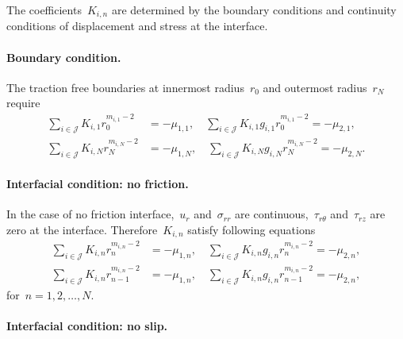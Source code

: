 \documentclass[preprint,10pt,times]{elsarticle}
\numberwithin{equation}{section}
\renewcommand{\>}{$\Rightarrow$}
\begin{document}
The coefficients~$K_{i,n}$ are determined by the boundary conditions and continuity conditions of displacement and stress at the interface.

\paragraph{Boundary condition.}

The traction free boundaries at innermost radius~$r_0$ and outermost radius~$r_N$ require
\begin{subequations}
	\begin{align}
	\sum_{i \in \mathcal{J}} K_{i,1} r_0^{m_{i,1}-2} & = -\mu_{1,1}, \quad
	\sum_{i \in \mathcal{J}} K_{i,1} g_{i,1} r_0^{m_{i,1}-2} = -\mu_{2,1},\\
	\sum_{i \in \mathcal{J}} K_{i,N} r_N^{m_{i,N}-2} & = -\mu_{1,N}, \quad
	\sum_{i \in \mathcal{J}} K_{i,N} g_{i,N} r_N^{m_{i,N}-2} = -\mu_{2,N}.
	\end{align}
	\label{eq:boundary}
\end{subequations}

\paragraph{Interfacial condition: no friction.}

In the case of no friction interface,~$u_r$ and~$\sigma_{rr}$ are continuous,~$\tau_{r\theta}$ and~$\tau_{rz}$ are zero at the interface. Therefore~$K_{i,n}$ satisfy following equations
\begin{subequations}
	\begin{align}
	\sum_{i \in \mathcal{J}} K_{i,n} r_{n}^{m_{i,n}-2} & = -\mu_{1,n}, \quad
	\sum_{i \in \mathcal{J}} K_{i,n} g_{i,n} r_{n}^{m_{i,n}-2} = -\mu_{2,n}, \\
	\sum_{i \in \mathcal{J}} K_{i,n} r_{n-1}^{m_{i,n}-2} & = -\mu_{1,n}, \quad
	\sum_{i \in \mathcal{J}} K_{i,n} g_{i,n} r_{n-1}^{m_{i,n}-2} = -\mu_{2,n},
	\end{align}
	\label{eq:nofriction_interface}
\end{subequations}
for~$n = 1,2,\dots,N$.


\paragraph{Interfacial condition: no slip.}
\end{document}
